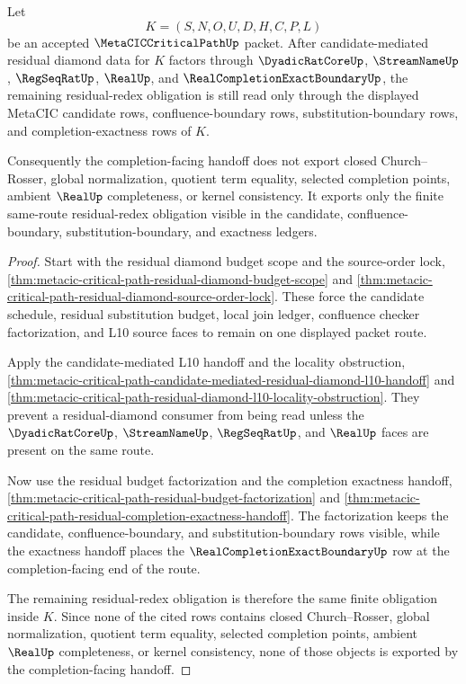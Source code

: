 \begin{theorem}
\label{thm:metacic-critical-path-residual-diamond-completion-nonescape}
Let
$$
K=(S,N,O,U,D,H,C,P,L)
$$
be an accepted $\MetaCICCriticalPathUp$ packet. After candidate-mediated residual diamond data for $K$ factors through $\DyadicRatCoreUp$, $\StreamNameUp$, $\RegSeqRatUp$, $\RealUp$, and $\RealCompletionExactBoundaryUp$, the remaining residual-redex obligation is still read only through the displayed MetaCIC candidate rows, confluence-boundary rows, substitution-boundary rows, and completion-exactness rows of $K$.

Consequently the completion-facing handoff does not export closed Church--Rosser, global normalization, quotient term equality, selected completion points, ambient $\RealUp$ completeness, or kernel consistency. It exports only the finite same-route residual-redex obligation visible in the candidate, confluence-boundary, substitution-boundary, and exactness ledgers.
\end{theorem}
\begin{proof}
Start with the residual diamond budget scope and the source-order lock, \autoref{thm:metacic-critical-path-residual-diamond-budget-scope} and \autoref{thm:metacic-critical-path-residual-diamond-source-order-lock}. These force the candidate schedule, residual substitution budget, local join ledger, confluence checker factorization, and L10 source faces to remain on one displayed packet route.

Apply the candidate-mediated L10 handoff and the locality obstruction, \autoref{thm:metacic-critical-path-candidate-mediated-residual-diamond-l10-handoff} and \autoref{thm:metacic-critical-path-residual-diamond-l10-locality-obstruction}. They prevent a residual-diamond consumer from being read unless the $\DyadicRatCoreUp$, $\StreamNameUp$, $\RegSeqRatUp$, and $\RealUp$ faces are present on the same route.

Now use the residual budget factorization and the completion exactness handoff, \autoref{thm:metacic-critical-path-residual-budget-factorization} and \autoref{thm:metacic-critical-path-residual-completion-exactness-handoff}. The factorization keeps the candidate, confluence-boundary, and substitution-boundary rows visible, while the exactness handoff places the $\RealCompletionExactBoundaryUp$ row at the completion-facing end of the route.

The remaining residual-redex obligation is therefore the same finite obligation inside $K$. Since none of the cited rows contains closed Church--Rosser, global normalization, quotient term equality, selected completion points, ambient $\RealUp$ completeness, or kernel consistency, none of those objects is exported by the completion-facing handoff.
\end{proof}
